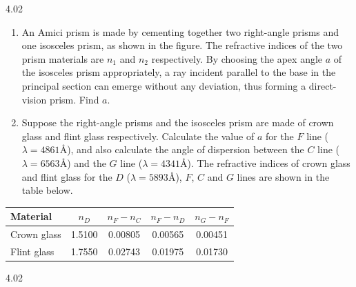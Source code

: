 \begin{problem}{4.02}
\begin{enumerate}[label=(\arabic*),leftmargin=2.2em,itemsep=4pt,topsep=2pt]
\item An Amici prism is made by cementing together two right-angle prisms and one isosceles prism, as shown in the figure. The refractive indices of the two prism materials are $n_1$ and $n_2$ respectively. By choosing the apex angle $a$ of the isosceles prism appropriately, a ray incident parallel to the base in the principal section can emerge without any deviation, thus forming a direct-vision prism. Find $a$.
\item Suppose the right-angle prisms and the isosceles prism are made of crown glass and flint glass respectively. Calculate the value of $a$ for the $F$ line ($\lambda = 4861\text{\AA}$), and also calculate the angle of dispersion between the $C$ line ($\lambda = 6563\text{\AA}$) and the $G$ line ($\lambda = 4341\text{\AA}$). The refractive indices of crown glass and flint glass for the $D$ ($\lambda = 5893\text{\AA}$), $F$, $C$ and $G$ lines are shown in the table below.
\end{enumerate}

\begin{center}
\begin{tabular}{lcccc}
\toprule
Material & $n_D$ & $n_F-n_C$ & $n_F-n_D$ & $n_G-n_F$\\
\midrule
Crown glass & 1.5100 & 0.00805 & 0.00565 & 0.00451\\
Flint glass & 1.7550 & 0.02743 & 0.01975 & 0.01730\\
\bottomrule
\end{tabular}
\end{center}
\end{problem}

\begin{figbox}{4.02}
\end{figbox}

